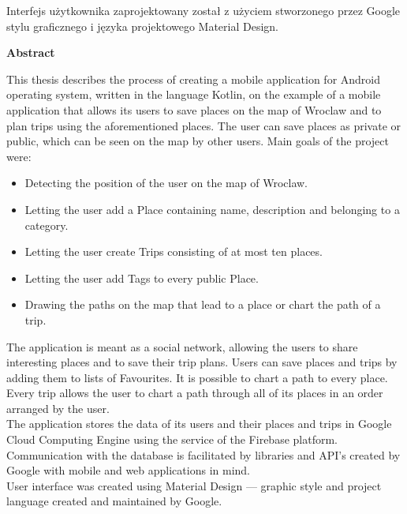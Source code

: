         Interfejs użytkownika zaprojektowany został z użyciem stworzonego przez Google stylu graficznego i języka projektowego Material Design.

\newpage

    \begin{flushleft}
    \Large \textbf{Abstract}
    \end{flushleft}

    \vspace{1cm}
        This thesis describes the process of creating a mobile application for Android operating system, written in the language Kotlin, on the example
        of a mobile application that allows its users to save places on the map of Wroclaw and to plan trips using the aforementioned places.
        The user can save places as private or public, which can be seen on the map by other users.
        Main goals of the project were:
        \begin{itemize}
            \item Detecting the position of the user on the map of Wroclaw.
            \item Letting the user add a Place containing name, description and belonging to a category.
            \item Letting the user create Trips consisting of at most ten places.
            \item Letting the user add Tags to every public Place.
            \item Drawing the paths on the map that lead to a place or chart the path of a trip.
        \end{itemize}

        The application is meant as a social network, allowing the users to share interesting places and to save their trip plans.
        Users can save places and trips by adding them to lists of Favourites. It is possible to chart a path to every place. Every trip allows the user
        to chart a path through all of its places in an order arranged by the user. \\ 

        The application stores the data of its users and their places and trips in Google Cloud Computing Engine using the service of the Firebase platform.
        Communication with the database is facilitated by libraries and API's created by Google with mobile and web applications in mind. \\ 

        User interface was created using Material Design — graphic style and project language created and maintained by Google.